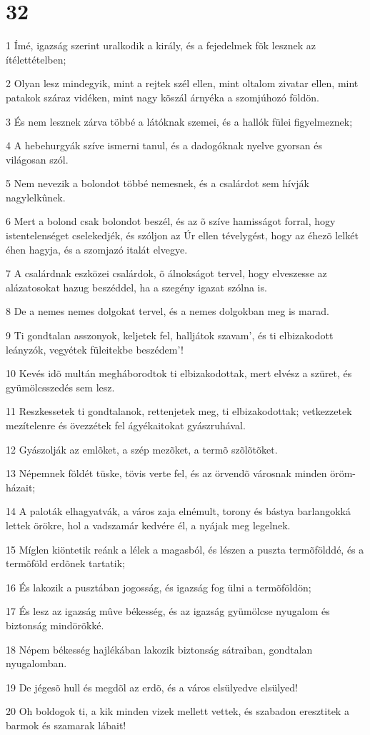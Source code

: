 \chapter{32}

\par 1 Ímé, igazság szerint uralkodik a király, és a fejedelmek fõk lesznek az ítélettételben;
\par 2 Olyan lesz mindegyik, mint a rejtek szél ellen, mint oltalom zivatar ellen, mint patakok száraz vidéken, mint nagy kõszál árnyéka a szomjúhozó földön.
\par 3 És nem lesznek zárva többé a látóknak szemei, és a hallók fülei figyelmeznek;
\par 4 A hebehurgyák szíve ismerni tanul, és a dadogóknak nyelve gyorsan és világosan szól.
\par 5 Nem nevezik a bolondot többé nemesnek, és a csalárdot sem hívják nagylelkûnek.
\par 6 Mert a bolond csak bolondot beszél, és az õ szíve hamisságot forral, hogy istentelenséget cselekedjék, és szóljon az Úr ellen tévelygést, hogy az éhezõ lelkét éhen hagyja, és a szomjazó italát elvegye.
\par 7 A csalárdnak eszközei csalárdok, õ álnokságot tervel, hogy elveszesse az alázatosokat hazug beszéddel, ha a szegény igazat szólna is.
\par 8 De a nemes nemes dolgokat tervel, és a nemes dolgokban meg is marad.
\par 9 Ti gondtalan asszonyok, keljetek fel, halljátok szavam', és ti elbizakodott leányzók, vegyétek füleitekbe beszédem'!
\par 10 Kevés idõ multán megháborodtok ti elbizakodottak, mert elvész a szüret, és gyümölcsszedés sem lesz.
\par 11 Reszkessetek ti gondtalanok, rettenjetek meg, ti elbizakodottak; vetkezzetek mezítelenre és övezzétek fel ágyékaitokat gyászruhával.
\par 12 Gyászolják az emlõket, a szép mezõket, a termõ szõlõtõket.
\par 13 Népemnek földét tüske, tövis verte fel, és az örvendõ városnak minden öröm-házait;
\par 14 A paloták elhagyatvák, a város zaja elnémult, torony és bástya barlangokká lettek örökre, hol a vadszamár kedvére él, a nyájak meg legelnek.
\par 15 Míglen kiöntetik reánk a lélek a magasból, és lészen a puszta termõfölddé, és a termõföld erdõnek tartatik;
\par 16 És lakozik a pusztában jogosság, és igazság fog ülni a termõföldön;
\par 17 És lesz az igazság mûve békesség, és az igazság gyümölcse nyugalom és biztonság mindörökké.
\par 18 Népem békesség hajlékában lakozik biztonság sátraiban, gondtalan nyugalomban.
\par 19 De jégesõ hull és megdõl az erdõ, és a város elsülyedve elsülyed!
\par 20 Oh boldogok ti, a kik minden vizek mellett vettek, és szabadon eresztitek a barmok és szamarak lábait!

